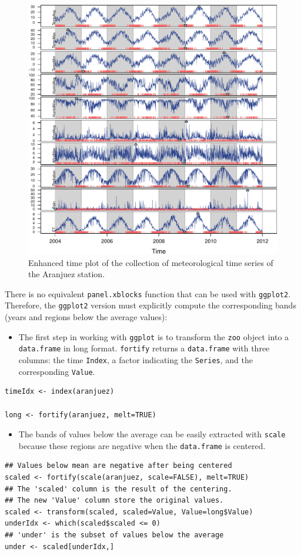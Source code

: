 \documentclass[smallroyalvopaper]{memoir}
\begin{document}
\begin{figure}[htb]
\centering
\includegraphics[width=.9\linewidth]{figs/aranjuezXblocks.pdf}
\caption{\label{fig:aranjuezEnhanced}Enhanced time plot of the collection of meteorological time series of the Aranjuez station.}
\end{figure}

There is no equivalent \texttt{panel.xblocks} function that can be used with
\texttt{ggplot2}. Therefore, the \texttt{ggplot2} version must explicitly compute
the corresponding bands (years and regions below the average values):

\begin{itemize}
\item The first step in working with \texttt{ggplot} is to transform the \texttt{zoo}
object into a \texttt{data.frame} in long format. \texttt{fortify} returns a
\texttt{data.frame} with three columns: the time \texttt{Index}, a factor
indicating the \texttt{Series}, and the corresponding \texttt{Value}.
\end{itemize}
\lstset{language=R,numbers=none}
\begin{lstlisting}
timeIdx <- index(aranjuez)

long <- fortify(aranjuez, melt=TRUE)
\end{lstlisting}

\begin{itemize}
\item The bands of values below the average can be easily extracted with
\texttt{scale} because these regions are negative when the \texttt{data.frame} is
centered.
\end{itemize}
\lstset{language=R,numbers=none}
\begin{lstlisting}
## Values below mean are negative after being centered
scaled <- fortify(scale(aranjuez, scale=FALSE), melt=TRUE)
## The 'scaled' column is the result of the centering.
## The new 'Value' column store the original values.
scaled <- transform(scaled, scaled=Value, Value=long$Value)
underIdx <- which(scaled$scaled <= 0)
## 'under' is the subset of values below the average
under <- scaled[underIdx,]
\end{lstlisting}
\end{document}
